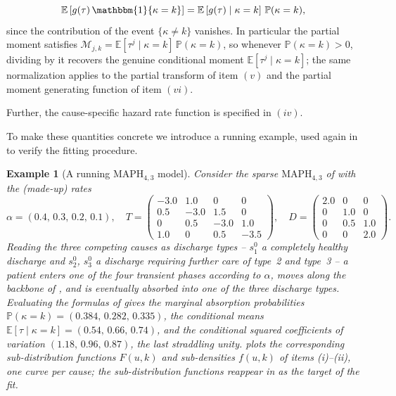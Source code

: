\documentclass{article}
\newtheorem{example}{Example}
\newcommand{\Prob}{\mathbb{P}}
\newcommand{\ind}[1]{\mathbbm{1}\{#1\}}
\newcommand{\ex}[1]{\mathbb{E}\left[#1\right]}
\newcommand{\subchg}[1]{#1}
\begin{document}
\[
\ex{g(\tau)\,\ind{\kappa=k}} = \ex{g(\tau)\mid \kappa=k}\,\Prob(\kappa=k),
\]
since the contribution of the event $\{\kappa\neq k\}$ vanishes. In particular the partial moment satisfies $\mathcal{M}_{j,k} = \ex{\tau^j \mid \kappa=k}\,\Prob(\kappa=k)$, so \subchg{whenever $\Prob(\kappa=k)>0$, dividing by it} recovers the genuine conditional moment $\ex{\tau^j \mid \kappa=k}$; the same normalization applies to the partial transform of item $(v)$ and the partial moment generating function of item $(vi)$.

Further, the cause-specific hazard rate function  is specified in $(iv)$.


To make these quantities concrete we introduce a running example, used again in  to verify the fitting procedure.

\begin{example}[A running $\text{MAPH}_{4,3}$ model]
\label{ex:running}
Consider the sparse $\text{MAPH}_{4,3}$ of  with the (made-up) rates
\begin{equation}
\label{eq:verif-truth}
\alpha = (0.4,\,0.3,\,0.2,\,0.1),\quad
T = \begin{pmatrix} -3.0 & 1.0 & 0 & 0\\ 0.5 & -3.0 & 1.5 & 0\\ 0 & 0.5 & -3.0 & 1.0\\ 1.0 & 0 & 0.5 & -3.5 \end{pmatrix},\quad
D = \begin{pmatrix} 2.0 & 0 & 0\\ 0 & 1.0 & 0\\ 0 & 0.5 & 1.0\\ 0 & 0 & 2.0 \end{pmatrix}.
\end{equation}
Reading the three competing causes as discharge types -- $s^0_1$ a completely healthy discharge and $s^0_2$, $s^0_3$ a discharge requiring further care of type~2 and type~3 -- a patient enters one of the four transient phases according to $\alpha$, moves along the backbone of , and is eventually absorbed into one of the three discharge types. Evaluating the formulas of  gives the marginal absorption probabilities $\Prob(\kappa=k)=(0.384,\,0.282,\,0.335)$, the conditional means $\ex{\tau\mid\kappa=k}=(0.54,\,0.66,\,0.74)$, and the conditional squared coefficients of variation $(1.18,\,0.96,\,0.87)$, the last straddling unity.  plots the corresponding sub-distribution functions $F(u,k)$ and sub-densities $f(u,k)$ of items (i)--(ii), one curve per cause; the sub-distribution functions reappear in  as the target of the fit.
\end{example}
\end{document}
